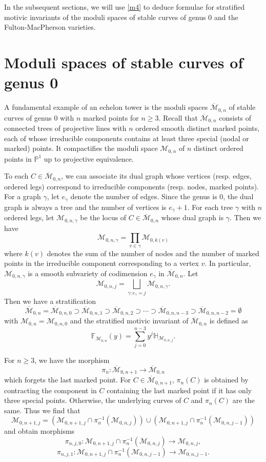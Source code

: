 \documentclass[11pt]{amsart}
\newcommand{\Mbarzn}{\overline{\mathcal M}_{0,n}}
\newcommand{\PP}{\mathbb{P}}
\newcommand{\cM}{\mathcal{M}}
\newcommand{\bcM}{\overline{\cM}}
\def\cM{\mathcal{M}}
\def\lra{\longrightarrow}
\def\beq{\begin{equation}}
\def\eeq{\end{equation}}
\def\HH{\mathbb{H}}
\def\FF{\mathbb{F}}
\begin{document}
\medskip

In the subsequent sections, we will use \eqref{m4} to deduce formulae for stratified motivic invariants of 
the moduli spaces of stable curves of genus $0$ and the Fulton-MacPherson varieties. 


\bigskip

\section{Moduli spaces of stable curves of genus 0}
A fundamental example of an echelon tower is the moduli spaces $\Mbarzn$ of stable curves of genus $0$ with $n$ marked points for $n\ge 3$. Recall that $\Mbarzn$ consists of connected trees of projective lines with $n$ ordered smooth distinct marked points, each of whose irreducible components contains at least three special (nodal or marked) points. It compactifies the moduli space $\cM_{0,n}$ of $n$ distinct ordered points in $\PP^1$ up to projective equivalence. 

To each $C\in \Mbarzn$, we can associate its dual graph whose vertices (resp. edges, ordered legs) correspond to irreducible components (resp. nodes, marked points). For a graph $\gamma$, let $e_\gamma$ denote the number of edges. Since the genus is 0, the dual graph is always a tree and the number of vertices is $e_\gamma+1$. 
For each tree $\gamma$ with $n$ ordered legs, let $\cM_{0,n,\gamma}$ be the locus of $C\in \Mbarzn$ whose dual graph is $\gamma$. Then we have
$$\cM_{0,n,\gamma}=\prod_{v\in \gamma}\cM_{0,k(v)}$$
where $k(v)$ denotes the sum of the number of nodes and the number of marked points in 
the irreducible component corresponding to a vertex $v$.  In particular, $\cM_{0,n,\gamma}$ is a smooth subvariety of codimension $e_\gamma$ in $\Mbarzn$.
Let 
\beq\label{m6}
\cM_{0,n,j}=\bigsqcup_{\gamma:e_\gamma=j}\cM_{0,n,\gamma}.\eeq
Then we have a stratification 
\beq\label{m9}
\Mbarzn=\bcM_{0,n,0}\supset \bcM_{0,n,1}\supset \bcM_{0,n,2}\supset\cdots\supset \bcM_{0,n,n-3}\supset \bcM_{0,n,n-2}=\emptyset\eeq
with $\cM_{0,n}=\cM_{0,n,0}$ and the stratified motivic invariant of $\Mbarzn$ is defined as
\beq\label{m8}
\FF_{\Mbarzn}(y) =\sum_{j=0}^{n-3} y^j\HH_{\cM_{0,n,j}}. 
\eeq

For $n\ge 3$, we have the morphism $$\pi_n:\bcM_{0,n+1}\lra \Mbarzn$$ which forgets the last marked point. 
For $C\in \bcM_{0,n+1}$, $\pi_n(C)$ is obtained by contracting the component in $C$ containing the last marked point if it has only three special points. Otherwise, the underlying curves of $C$ and $\pi_n(C)$ are the same. 
Thus we find that 
$$\cM_{0,n+1,j} =  \left(\cM_{0,n+1,j}\cap \pi_n^{-1}(\cM_{0,n,j})\right) \cup \left(\cM_{0,n+1,j}\cap \pi_n^{-1}(\cM_{0,n,j-1})\right)$$
and obtain morphisms
\beq\label{m5} \pi_{n,j,0}: \cM_{0,n+1,j}\cap \pi_n^{-1}(\cM_{0,n,j})\lra \cM_{0,n,j},\eeq
\[ \pi_{n,j,1}: \cM_{0,n+1,j}\cap \pi_n^{-1}(\cM_{0,n,j-1})\lra \cM_{0,n,j-1}.\]
\end{document}
